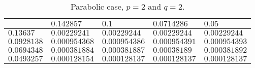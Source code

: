 \begin{table}[!ht]
{        \def\arraystretch{1.25}
        \begin{tabular}{ | C{2cm} || C{2cm} | C{2cm} | C{2cm} | C{2cm} | } %
            \hline
             & $\num{0.142857}$ & $\num{0.1}$ & $\num{0.0714286}$ & $\num{0.05}$ \\
            \hline
            \hline
            $\num{0.13637}$ & $\num{0.00229241}$ & $\num{0.00229244}$ & $\num{0.00229244}$ & $\num{0.00229244}$ \\
            $\num{0.0928138}$ & $\num{0.000954368}$ & $\num{0.000954386}$ & $\num{0.000954391}$ & $\num{0.000954393}$ \\
            $\num{0.0694348}$ & $\num{0.000381884}$ & $\num{0.000381887}$ & $\num{0.00038189}$ & $\num{0.000381892}$ \\
            $\num{0.0493257}$ & $\num{0.000128154}$ & $\num{0.000128137}$ & $\num{0.000128137}$ & $\num{0.000128137}$ \\
            \hline
        \end{tabular}
    }
    \par\bigskip
    \centering
    \caption{Parabolic case, $p = 2$ and $q = 2$.}
\end{table}
\vspace*{\fill}

\newpage

